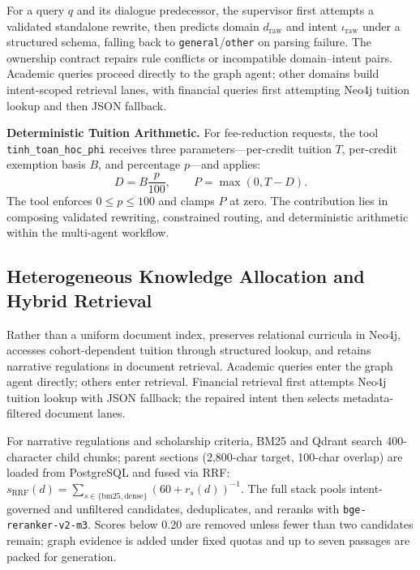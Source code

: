 For a query $q$ and its dialogue predecessor, the supervisor first attempts a validated standalone rewrite, then predicts domain $d_{\mathrm{raw}}$ and intent $\iota_{\mathrm{raw}}$ under a structured schema, falling back to \texttt{general}/\texttt{other} on parsing failure. The ownership contract repairs rule conflicts or incompatible domain--intent pairs. Academic queries proceed directly to the graph agent; other domains build intent-scoped retrieval lanes, with financial queries first attempting Neo4j tuition lookup and then JSON fallback.

\textbf{Deterministic Tuition Arithmetic.}
For fee-reduction requests, the tool \texttt{tinh\_}\allowbreak\texttt{toan\_}\allowbreak\texttt{hoc\_}\allowbreak\texttt{phi} receives three parameters---per-credit tuition $T$, per-credit exemption basis $B$, and percentage $p$---and applies:
\begin{equation}
  D = B\frac{p}{100}, \qquad P = \max(0, T-D).
  \label{eq:tuition_reduction}
\end{equation}
The tool enforces $0 \le p \le 100$ and clamps $P$ at zero. The contribution lies in composing validated rewriting, constrained routing, and deterministic arithmetic within the multi-agent workflow.

\subsection{Heterogeneous Knowledge Allocation and Hybrid Retrieval}
\label{sec:hybrid_retrieval}

Rather than a uniform document index, \system{} preserves relational curricula in Neo4j, accesses cohort-dependent tuition through structured lookup, and retains narrative regulations in document retrieval. Academic queries enter the graph agent directly; others enter retrieval. Financial retrieval first attempts Neo4j tuition lookup with JSON fallback; the repaired intent then selects metadata-filtered document lanes.

For narrative regulations and scholarship criteria, BM25 and Qdrant search 400-character child chunks; parent sections (2,800-char target, 100-char overlap) are loaded from PostgreSQL and fused via RRF: $s_{\mathrm{RRF}}(d)=\sum_{s\in\{\mathrm{bm25},\mathrm{dense}\}}(60+r_s(d))^{-1}$. The full stack pools intent-governed and unfiltered candidates, deduplicates, and reranks with \texttt{bge-reranker-v2-m3}. Scores below 0.20 are removed unless fewer than two candidates remain; graph evidence is added under fixed quotas and up to seven passages are packed for generation.


